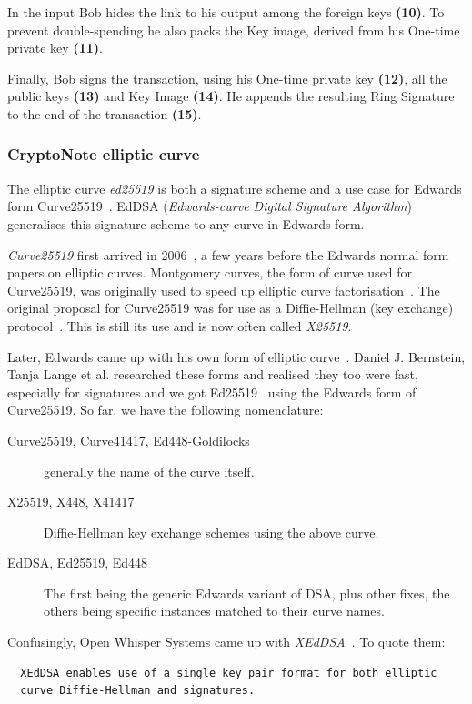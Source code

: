 In the input Bob hides the link to his output among the foreign keys \textbf{(10)}. To prevent double-spending he also packs the Key image, derived from his One-time private key \textbf{(11)}.

Finally, Bob signs the transaction, using his One-time private key \textbf{(12)}, all the public keys \textbf{(13)} and Key Image \textbf{(14)}. He appends the resulting Ring Signature to the end of the transaction \textbf{(15)}.

\subsubsection{CryptoNote elliptic curve} \label{sec:ed25519}
The elliptic curve \emph{ed25519} is both a signature scheme and a use case for Edwards form Curve25519~\cite{eddsa}. EdDSA (\emph{Edwards-curve Digital Signature Algorithm}) generalises this signature scheme to any curve in Edwards form.

\emph{Curve25519} first arrived in 2006~\cite{curve25519}, a few years before the Edwards normal form papers on elliptic curves. Montgomery curves, the form of curve used for Curve25519, was originally used to speed up elliptic curve factorisation~\cite{montgomery}. The original proposal for Curve25519 was for use as a Diffie-Hellman (key exchange) protocol~\cite{Diffie:2006:NDC:2263321.2269104}. This is still its use and is now often called \emph{X25519}.

Later, Edwards came up with his own form of elliptic curve~\cite{edward}. Daniel J. Bernstein, Tanja Lange et al. researched these forms and realised they too were fast, especially for signatures and we got Ed25519~\cite{eddsa} using the Edwards form of Curve25519. So far, we have the following nomenclature:
\begin{description}
  \item [Curve25519, Curve41417, Ed448-Goldilocks] generally the name of the curve itself.
  \item [X25519, X448, X41417] Diffie-Hellman key exchange schemes using the above curve.
  \item [EdDSA, Ed25519, Ed448] The first being the generic Edwards variant of DSA, plus other fixes, the others being specific instances matched to their curve names.
\end{description}
Confusingly, Open Whisper Systems came up with \emph{XEdDSA}~\cite{signal}. To quote them:
\begin{verbatim}
  XEdDSA enables use of a single key pair format for both elliptic
  curve Diffie-Hellman and signatures.
\end{verbatim}


